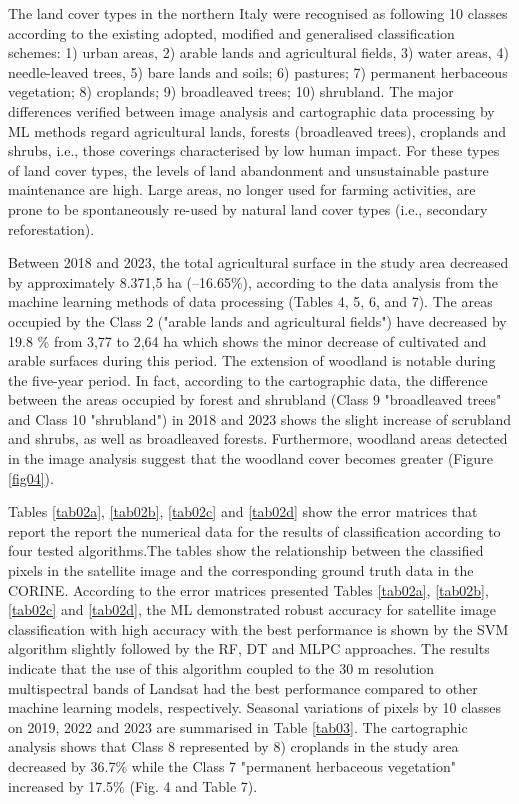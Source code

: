 \documentclass[remotesensing,article,submit,pdftex,moreauthors]{Definitions/mdpi}
\begin{document}
The land cover types in the northern Italy were recognised as following 10 classes according to the existing adopted, modified and generalised classification schemes: 1) urban areas, 2) arable lands and agricultural fields, 3) water areas, 4) needle-leaved trees, 5) bare lands and soils; 6) pastures; 7) permanent herbaceous vegetation; 8) croplands; 9) broadleaved trees; 10) shrubland.  The major differences verified between image analysis and cartographic data processing by ML methods regard agricultural lands, forests (broadleaved trees), croplands and shrubs, i.e., those coverings characterised by low human impact. For these types of land cover types, the levels of land abandonment and unsustainable pasture maintenance are high. Large areas, no longer used for farming activities, are prone to be spontaneously re-used by natural land cover types (i.e., secondary reforestation). 

Between 2018 and 2023, the total agricultural surface in the study area decreased by approximately 8.371,5 ha (--16.65\%), according to the data analysis from the machine learning methods of data processing (Tables 4, 5, 6, and 7). The areas occupied by the Class 2 ("arable lands and agricultural fields") have decreased by 19.8 \% from 3,77 to 2,64  ha which shows the minor decrease of cultivated and arable surfaces during this period. The extension of woodland is notable during the five-year period. In fact, according to the cartographic data, the difference between the areas occupied by forest and shrubland (Class  9 "broadleaved trees" and Class 10 "shrubland") in 2018 and 2023 shows the slight increase of scrubland and shrubs, as well as broadleaved forests. Furthermore, woodland areas detected in the image analysis suggest that the woodland cover becomes greater (Figure \ref{fig04}). 

Tables \ref{tab02a}, \ref{tab02b}, \ref{tab02c} and \ref{tab02d} show the error matrices that report the report the numerical data{ }for the results of classification according to four tested algorithms{.}The tables show the relationship between the classified pixels in the satellite image and the corresponding ground truth data in the CORINE{.} {According to the error matrices presented Tables} \ref{tab02a}, \ref{tab02b}, \ref{tab02c} and \ref{tab02d}, the ML demonstrated robust accuracy for satellite image classification with high accuracy with the best performance is shown by the SVM algorithm slightly followed by the RF, DT and MLPC approaches. {The results indicate that the use of this algorithm coupled to the 30 m resolution multispectral bands of Landsat had the best performance compared to other machine learning models, respectively. }{Seasonal} variations of pixels by 10 classes on 2019, 2022 and 2023 are summarised in Table \ref{tab03}. The cartographic analysis shows that Class 8 represented by 8) croplands in the study area decreased by 36.7\% while the Class 7 "permanent herbaceous vegetation" increased by 17.5\% (Fig. 4 and Table 7){.}  
\end{document}
